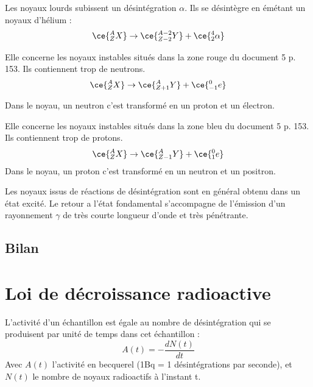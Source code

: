 \begin{definition}\label{def:arad}
    Les noyaux lourds subissent un désintégration \(\alpha \). Ils se désintègre en émétant un noyaux d'hélium : 
    \[
        \ce{^{A}_{Z}X} \to \ce{^{A-2}_{Z-2}Y} + \ce{^{4}_{2}\alpha }
    \] 
\end{definition}

\begin{definition}\label{def:bmrad}
    Elle concerne les noyaux instables situés dans la zone rouge du document 5 p. 153. Ils contiennent trop de neutrons. 
\[
    \ce{^{A}_{Z}X} \to \ce{^{A}_{Z+1}Y} + \ce{^{0}_{-1}e}
\]

Dans le noyau, un neutron c'est transformé en un proton et un électron. 
\end{definition}

\begin{definition}\label{def:bprad}
    Elle concerne les noyaux instables situés dans la zone bleu du document 5 p. 153. Ils contiennent trop de protons. 
    \[
        \ce{^{A}_{Z}X} \to \ce{^{A}_{Z-1}Y} + \ce{^{0}_{1}e}
    \]
    Dans le noyau, un proton c'est transformé en un neutron et un positron. 
\end{definition}

\begin{definition}\label{def:grad}
    Les noyaux issus de réactions de désintégration sont en général obtenu dans un état excité. Le retour a l'état fondamental s'accompagne de l'émission d'un rayonnement \(\gamma\) de très courte longueur d'onde et très pénétrante. 
\end{definition}

\subsection{Bilan}
\section{Loi de décroissance radioactive}

\begin{definition}\label{def:radact}
    L'activité d'un échantillon est égale au nombre de désintégration qui se produisent par unité de temps dans cet échantillon : 
\[
    A(t) = -\frac{dN(t)}{dt}
\]
Avec \(A(t)\) l'activité en becquerel (1Bq = 1 désintégrations par seconde), et \(N(t)\) le nombre de noyaux radioactifs à l'instant t.
\end{definition}

